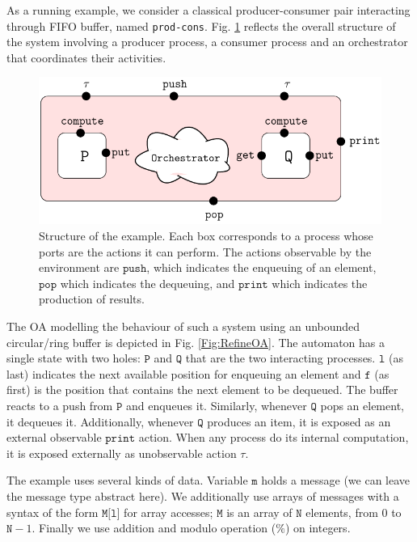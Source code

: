 \documentclass[runningheads]{llncs}
\begin{document}
\begin{example}\label{Example:fifo-system} As a running example, we consider a classical producer-consumer pair  interacting through FIFO buffer, named \texttt{prod-cons}.  Fig. \ref{Fig:Architect} reflects the overall structure of the system involving a producer process, a consumer process and an orchestrator that coordinates  their activities. 

\begin{figure}[!ht]
 \centering
   \includegraphics[width=.70\textwidth]{Figures/Architecture.pdf}
   \caption{Structure of the example. Each box corresponds to a process whose ports are the actions it can perform. The  actions observable by the environment are $\texttt{push}$, which indicates the enqueuing of an element, $\texttt{pop}$ which indicates the dequeuing, and $\texttt{print}$ which indicates the production of results. \label{Fig:Architect}} 
\end{figure}


The OA  modelling the behaviour of such a system  using an  unbounded circular/ring buffer is depicted in Fig. \ref{Fig:RefineOA}.  The automaton has a single state with  two holes: $\texttt{P}$ and  $\texttt{Q}$ that are the two interacting processes.  $\texttt{l}$ (as last)  indicates the next available position for  enqueuing an element  and  $\texttt{f}$ (as first) is the position that contains the next element to be dequeued. %
The buffer reacts to a push from $\texttt{P}$ and enqueues it. Similarly, whenever   $\texttt{Q}$ pops an element, it dequeues it. Additionally, whenever $\texttt{Q}$ produces an item, it is exposed as an external observable  $\texttt{print}$ action. 
When any process do its internal computation, it is exposed externally as unobservable action $\tau$. 

The example uses several kinds of data. Variable $\texttt{m}$ holds a message (we can leave the message type abstract here). We additionally use arrays of messages with a syntax of the form $\texttt{M[l]}$ for array accesses; $\texttt{M}$ is an array of $\texttt{N}$ elements, from $0$ to $\texttt{N}-1$. Finally we use addition and modulo operation ($\%$) on integers.


\end{example}
\end{document}
